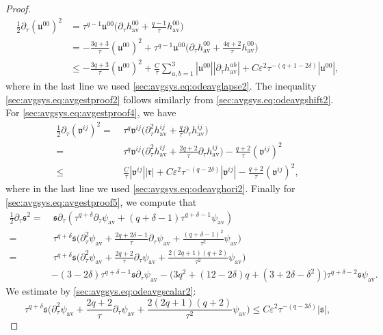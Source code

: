 \documentclass{article}
\newcommand{\av}{\mathrm{av}}
\newcommand{\mf}{\mathfrak}
\newcommand{\ve}{\varepsilon}
\newcommand{\pa}{\partial}
\begin{document}
\begin{proof}
\begin{align}
        \frac{1}{2}\pa_\tau (\mf{u}^{00})^2 &= \tau^{q-1}\mf{u}^{00}\big(\pa_\tau h_{\av}^{00} + \frac{q-1}{\tau}h_{\av}^{00}\big)\nonumber\\
        &= - \frac{3q+3}{\tau}(\mf{u}^{00})^2 + \tau^{q-1}\mf{u}^{00}\big(\pa_\tau h_{\av}^{00} + \frac{4q+2}{\tau}h_{\av}^{00}\big)\nonumber\\
        &\leq -\frac{3q+3}{\tau}(\mf{u}^{00})^2 + \frac{C}{\tau}\sum_{a,b=1}^3|\mf{u}^{00}||\pa_\tau h_{\av}^{ab}| + C\ve^2\tau^{-(q+1-2\delta)}|\mf{u}^{00}|,
    \end{align}
    where in the last line we used \eqref{sec:avgsys.eq:odeavglapse2}. The inequality \eqref{sec:avgsys.eq:avgestproof2} follows similarly from \eqref{sec:avgsys.eq:odeavgshift2}. For \eqref{sec:avgsys.eq:avgestproof4}, we have
    \begin{align}
        \frac{1}{2}\pa_\tau (\mf{v}^{ij})^2 =&\>\tau^q\mf{v}^{ij}\big(\pa_\tau^2 h_{\av}^{ij} + \frac{q}{\tau}\pa_\tau h_{\av}^{ij}\big)\nonumber\\
        =&\>\tau^q\mf{v}^{ij}\big(\pa_\tau^2h_{\av}^{ij}+\frac{2q+2}{\tau}\pa_\tau h_{\av}^{ij}\big) - \frac{q+2}{\tau}(\mf{v}^{ij})^2\nonumber\\
        \leq&\> \frac{C}{\tau}|\mf{v}^{ij}||\mf{r}| + C\ve^2 \tau^{-(q-2\delta)}|\mf{v}^{ij}|- \frac{q+2}{\tau}(\mf{v}^{ij})^2,
    \end{align}
    where in the last line we used \eqref{sec:avgsys.eq:odeavghori2}. Finally for \eqref{sec:avgsys.eq:avgestproof5}, we compute that
    \begin{align}
        \frac{1}{2}\pa_\tau \mf{s}^2 = &\>\mf{s}\pa_\tau (\tau^{q+\delta} \pa_\tau \psi_{\av} + (q+\delta-1)\tau^{q+\delta-1}\psi_{\av})\nonumber\\
        =&\>\tau^{q+\delta} \mf{s}\Big(\pa_\tau^2\psi_{\av} + \frac{2q+2\delta-1}{\tau}\pa_\tau \psi_{\av} + \frac{(q+\delta-1)^2}{\tau^2}\psi_{\av}\Big)\nonumber\\
        =&\>\tau^{q+\delta}\mf{s}\Big(\pa_\tau^2\psi_{\av} + \frac{2q+2}{\tau}\pa_\tau \psi_{\av} + \frac{2(2q+1)(q+2)}{\tau^2}\psi_{\av}\Big)\nonumber\\
        &-(3-2\delta)\tau^{q+\delta-1}\mf{s}\pa_\tau \psi_{\av} - \big(3q^2+(12-2\delta)q+(3+2\delta-\delta^2)\big)\tau^{q+\delta-2}\mf{s}\psi_{\av}.
    \end{align}
    We estimate by \eqref{sec:avgsys.eq:odeavgscalar2}:
    \begin{equation}
        \tau^{q+\delta}\mf{s}\Big(\pa_\tau^2\psi_{\av} + \frac{2q+2}{\tau}\pa_\tau \psi_{\av} + \frac{2(2q+1)(q+2)}{\tau^2}\psi_{\av}\Big) \leq C\ve^2\tau^{-(q-3\delta)}|\mf{s}|,

\end{equation}
\end{proof}
\end{document}
